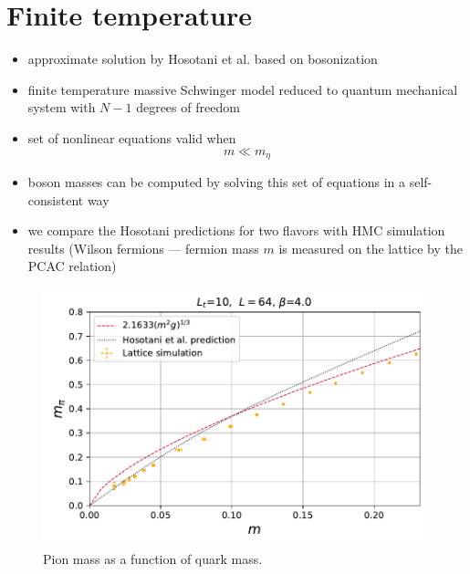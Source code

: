 \documentclass[a4paper,11pt]{article}
\begin{document}
  
\section{Finite temperature}

  \begin{itemize}
    \item approximate solution by Hosotani et al.
      based on bosonization
    \item finite temperature massive Schwinger model reduced to
      quantum mechanical system with $N - 1$ degrees of freedom
    \item set of nonlinear equations valid when
      \[
        m \ll m_\eta
      \]
    \item boson masses can be computed by solving this set of 
      equations in a self-consistent way
    \item we compare the Hosotani predictions for two flavors
      with HMC simulation results (Wilson fermions --- fermion mass
      $m$ is measured on the lattice by the PCAC relation)
  \end{itemize}

\begin{figure}
  \includegraphics[width=1\textwidth]{figs/MPi64x10vsMFiniteT_Pt2}
  \caption{Pion mass as a function of quark mass.}
\end{figure}
\end{document}
